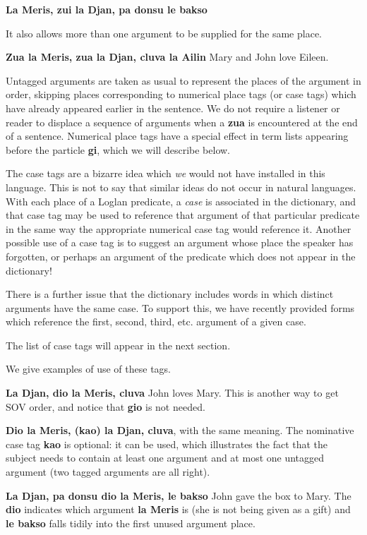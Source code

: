 \documentclass[12pt]{book}
\begin{document}
{{\bf La Meris, zui la Djan, pa donsu le bakso}

It also allows more than one argument to be supplied for the same place.

{\bf Zua la Meris, zua la Djan, cluva la Ailin}  Mary and John love Eileen.

Untagged arguments are taken as usual to represent the places of the argument in order, skipping places corresponding to numerical place tags (or case tags) which have already appeared earlier in the sentence.  We do not require a listener or reader to displace a sequence of arguments when a {\bf zua} is encountered at the end of a sentence.  Numerical place tags have a special effect in term lists appearing before the particle {\bf gi}, which we will describe below.

The case tags are a bizarre idea which {\em we\/} would not have installed in this language.  This is not to say that similar ideas do not occur in natural languages.  With each place of a Loglan predicate, a {\em case\/} is associated in the dictionary, and that case tag may be used to reference that argument of that particular predicate in the same way the appropriate numerical case tag would reference it.  Another possible use of a case tag is to suggest an argument whose place the speaker has forgotten, or perhaps an argument of the predicate which does not appear in the dictionary!

There is a further issue that the dictionary includes words in which distinct arguments have the same case.  To support this, we have recently provided forms which reference the first, second, third, etc. argument of a given case.

The list of case tags will appear in the next section.

We give examples of use of these tags.

{\bf La Djan, dio la Meris, cluva}  John loves Mary.  This is another way to get SOV order, and notice that {\bf gio} is not needed.

{\bf Dio la Meris, (kao) la Djan, cluva}, with the same meaning.  The nominative case tag {\bf kao} is optional:  it can be used, which illustrates the fact that the subject needs to contain at least one argument
and at most one untagged argument (two tagged arguments are all right).

{\bf La Djan, pa donsu dio la Meris, le bakso}  John gave the box to Mary.  The {\bf dio} indicates which argument {\bf la Meris} is (she is not being given as a gift) and {\bf le bakso} falls tidily into the first unused argument place.

}
\end{document}
